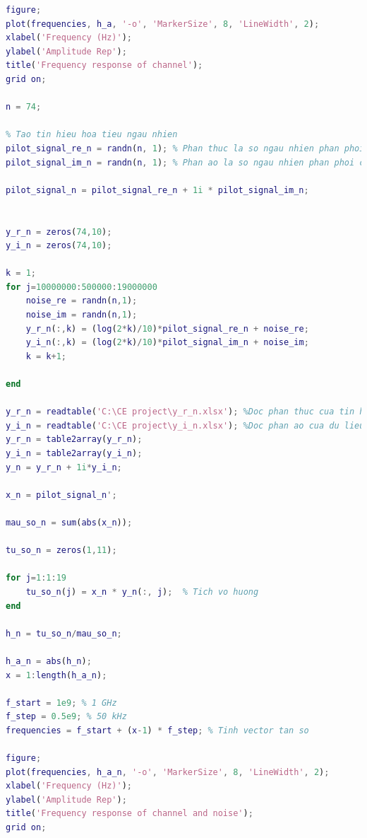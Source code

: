 \documentclass{article}
\begin{document}
\begin{lstlisting}[language=Matlab, caption=Kênh truyền ngõ vào đơn ngõ ra đơn]
figure; 
plot(frequencies, h_a, '-o', 'MarkerSize', 8, 'LineWidth', 2); 
xlabel('Frequency (Hz)');
ylabel('Amplitude Rep'); 
title('Frequency response of channel'); 
grid on; 

n = 74;

% Tao tin hieu hoa tieu ngau nhien
pilot_signal_re_n = randn(n, 1); % Phan thuc la so ngau nhien phan phoi chuan trong doan [0:1]
pilot_signal_im_n = randn(n, 1); % Phan ao la so ngau nhien phan phoi chuan trong doan [0:1]

pilot_signal_n = pilot_signal_re_n + 1i * pilot_signal_im_n;


y_r_n = zeros(74,10);
y_i_n = zeros(74,10);

k = 1;
for j=10000000:500000:19000000 
    noise_re = randn(n,1);
    noise_im = randn(n,1);
    y_r_n(:,k) = (log(2*k)/10)*pilot_signal_re_n + noise_re;
    y_i_n(:,k) = (log(2*k)/10)*pilot_signal_im_n + noise_im;
    k = k+1;
   
end

y_r_n = readtable('C:\CE project\y_r_n.xlsx'); %Doc phan thuc cua tin hieu quan sat
y_i_n = readtable('C:\CE project\y_i_n.xlsx'); %Doc phan ao cua du lieu quan sat
y_r_n = table2array(y_r_n);
y_i_n = table2array(y_i_n);
y_n = y_r_n + 1i*y_i_n;

x_n = pilot_signal_n';

mau_so_n = sum(abs(x_n));

tu_so_n = zeros(1,11);

for j=1:1:19
    tu_so_n(j) = x_n * y_n(:, j);  % Tich vo huong
end

h_n = tu_so_n/mau_so_n;

h_a_n = abs(h_n);
x = 1:length(h_a_n);

f_start = 1e9; % 1 GHz
f_step = 0.5e9; % 50 kHz
frequencies = f_start + (x-1) * f_step; % Tinh vector tan so

figure; 
plot(frequencies, h_a_n, '-o', 'MarkerSize', 8, 'LineWidth', 2); 
xlabel('Frequency (Hz)'); 
ylabel('Amplitude Rep'); 
title('Frequency response of channel and noise'); 
grid on; 

\end{lstlisting}
\end{document}
